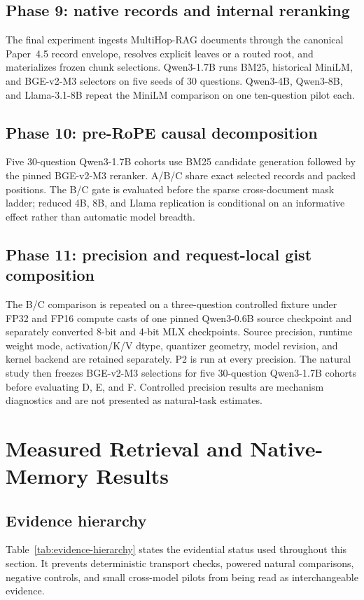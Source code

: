 \documentclass[11pt]{article}
\begin{document}
\subsection{Phase 9: native records and internal reranking}
The final experiment ingests MultiHop-RAG documents through the canonical
Paper~4.5 record envelope, resolves explicit leaves or a routed root, and
materializes frozen chunk selections. Qwen3-1.7B runs BM25, historical MiniLM,
and BGE-v2-M3 selectors on five seeds of 30 questions. Qwen3-4B, Qwen3-8B, and
Llama-3.1-8B repeat the MiniLM comparison on one ten-question pilot each.

\subsection{Phase 10: pre-RoPE causal decomposition}
Five 30-question Qwen3-1.7B cohorts use BM25 candidate generation followed by
the pinned BGE-v2-M3 reranker. A/B/C share exact selected records and packed
positions. The B/C gate is evaluated before the sparse cross-document mask
ladder; reduced 4B, 8B, and Llama replication is conditional on an informative
effect rather than automatic model breadth.

\subsection{Phase 11: precision and request-local gist composition}
The B/C comparison is repeated on a three-question controlled fixture under
FP32 and FP16 compute casts of one pinned Qwen3-0.6B source checkpoint and
separately converted 8-bit and 4-bit MLX checkpoints. Source precision,
runtime weight mode, activation/K/V dtype, quantizer geometry, model revision,
and kernel backend are retained separately. P2 is run at every precision.
The natural study then freezes BGE-v2-M3 selections for five 30-question
Qwen3-1.7B cohorts before evaluating D, E, and F. Controlled precision results
are mechanism diagnostics and are not presented as natural-task estimates.

\section{Measured Retrieval and Native-Memory Results}

\subsection{Evidence hierarchy}
Table~\ref{tab:evidence-hierarchy} states the evidential status used throughout
this section. It prevents deterministic transport checks, powered natural
comparisons, negative controls, and small cross-model pilots from being read as
interchangeable evidence.
\end{document}

